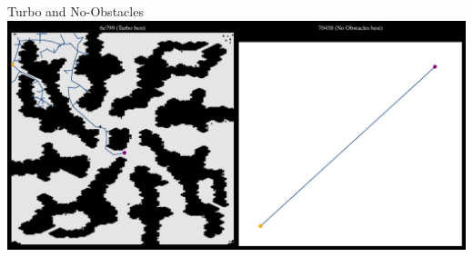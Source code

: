 \documentclass[aspectratio=169]{beamer}
\begin{document}
\begin{frame}{Turbo and No-Obstacles}
    \includegraphics[width=1.0\linewidth, keepaspectratio]{figures/learned_split_3.pdf}
\end{frame}
\end{document}
